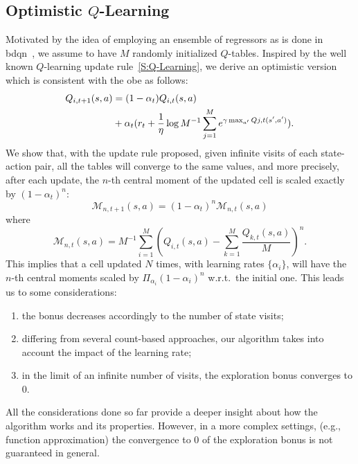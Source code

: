\subsection{Optimistic $Q$-Learning}
Motivated by the idea of employing an ensemble of regressors as is done in \gls{bdqn}~\cite{osband2017deep}, we assume to have $M$ randomly initialized $Q$-tables. Inspired by the well known $Q$-learning update rule~\ref{S:Q-Learning}, we derive an optimistic version which is consistent with the \gls{obe} as follows:
\begin{align*}
      \small  Q_{i, t+1}(s,a) &= (1-\alpha_t)Q_{i,t}(s,a)  \nonumber  \\
  & \small + \alpha_t (r_t + \frac{1}{\eta} \log M^{-1} \sum_{j=1}^M e^{\gamma \max_{a'} Q{j,t}(s', a')}).\nonumber
\end{align*}
\label{def:optimistic_qlearning}
We show that, with the update rule proposed, given infinite visits of each state-action pair, all the tables will converge to the same values, and more precisely, after each update, the $n$-th central moment of the updated cell is scaled exactly by $(1 - \alpha_t)^n$:
\begin{equation}
 \mathcal{M}_{n,t+1}(s,a) = (1-\alpha_t)^n \mathcal{M}_{n,t}(s,a) \label{momentdecreasing}
\end{equation}
where 
\begin{equation}
 \mathcal{M}_{n,t}(s,a) = M^{-1} \sum_{i=1}^M (Q_{i,t}(s,a) - \sum_{k=1}^M \frac{Q_{k,t}(s,a)}{M})^n. \nonumber
\end{equation}
This implies that a cell updated $N$ times, with learning rates $\{\alpha_i\}$, will have the $n$-th central moments scaled by $\Pi_{\alpha_i}(1-\alpha_i)^n$ w.r.t.\ the initial one. This leads us to some considerations:
\begin{enumerate}
 \item the bonus decreases accordingly to the number of state visits;
 \item differing from several count-based approaches, our algorithm takes into account the impact of the learning rate;
 \item in the limit of an infinite number of visits, the exploration bonus converges to $0$.
\end{enumerate}
All the considerations done so far provide a deeper insight about how the algorithm works and its properties. However, in a more complex settings, (e.g., function approximation) the convergence to $0$ of the exploration bonus is not guaranteed in general.

